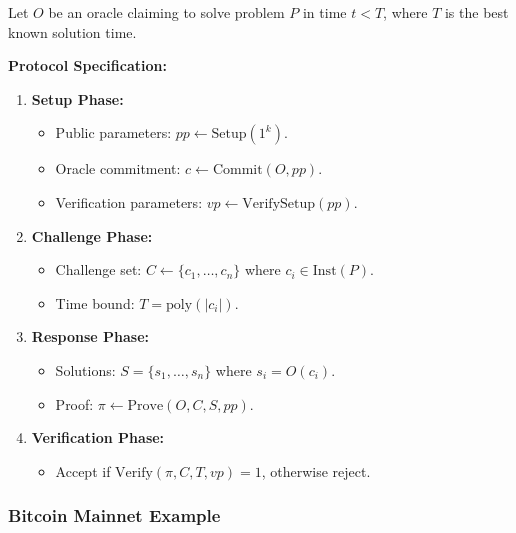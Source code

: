 \documentclass[11pt]{article}
\begin{document}
Let $O$ be an oracle claiming to solve problem $P$ in time $t < T$, where $T$ is the best known solution time.

\noindent\textbf{Protocol Specification:}
\begin{enumerate}[label=(\arabic*)]
    \item \textbf{Setup Phase:}
    \begin{itemize}
      \item Public parameters: $pp \leftarrow \text{Setup}(1^k)$.
      \item Oracle commitment: $c \leftarrow \text{Commit}(O, pp)$.
      \item Verification parameters: $vp \leftarrow \text{VerifySetup}(pp)$.
    \end{itemize}
    \item \textbf{Challenge Phase:}
    \begin{itemize}
      \item Challenge set: $C \leftarrow \{c_1, \dots, c_n\}$ where $c_i \in \text{Inst}(P)$.
      \item Time bound: $T = \text{poly}(|c_i|)$.
    \end{itemize}
    \item \textbf{Response Phase:}
    \begin{itemize}
      \item Solutions: $S = \{s_1, \dots, s_n\}$ where $s_i = O(c_i)$.
      \item Proof: $\pi \leftarrow \text{Prove}(O,C,S,pp)$.
    \end{itemize}
    \item \textbf{Verification Phase:}
    \begin{itemize}
      \item Accept if $\text{Verify}(\pi,C,T,vp)=1$, otherwise reject.
    \end{itemize}
\end{enumerate}

\subsubsection{Bitcoin Mainnet Example}
\end{document}
